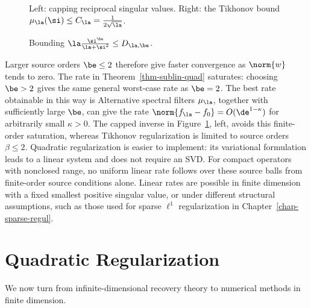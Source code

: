 \begin{figure}[tbp]
\centering
{}
\caption{Left: capping reciprocal singular values. Right: the Tikhonov bound $\mu_{\la}(\si) \leq C_\la = \frac{1}{2\sqrt{\la}}$.}
\label{fig-bound-regul-variance}
\end{figure}


\begin{figure}[tbp]
\centering
{}
\caption{Bounding $\la \frac{\si^\be}{\la+\si^2} \leq D_{\la,\be}$.}
\label{fig-ip-bound-regul}
\end{figure}



Larger source orders $\be \leq 2$ therefore give faster convergence as $\norm{w}$ tends to zero.
The rate in Theorem~\ref{thm-sublin-quad} saturates: choosing $\be > 2$ gives the same general worst-case rate as $\be=2$. The best rate obtainable in this way is
Alternative spectral filters $\mu_\la$, together with sufficiently large $\be$, can give the rate $\norm{f_\la - f_0} = O( \de^{1-\kappa} )$ for arbitrarily small $\kappa>0$.
%
The capped inverse in Figure~\ref{fig-bound-regul-variance}, left, avoids this finite-order saturation, whereas Tikhonov regularization is limited to source orders $\beta\leq2$. Quadratic regularization is easier to implement: its variational formulation leads to a linear system and does not require an SVD.
%
For compact operators with nonclosed range, no uniform linear rate follows over these source balls from finite-order source conditions alone. Linear rates are possible in finite dimension with a fixed smallest positive singular value, or under different structural assumptions, such as those used for sparse $\ell^1$ regularization in Chapter~\ref{chap-sparse-regul}.

\section{Quadratic Regularization}

We now turn from infinite-dimensional recovery theory to numerical methods in finite dimension.

